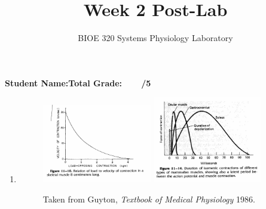 \documentclass{article}
\title{Week 2 Post-Lab}
\author{BIOE 320 Systems Physiology Laboratory}
\date{}
\begin{document}
\maketitle
\large

\textbf{Student Name:}\hfill 	\textbf{Total Grade:\ \ \ \ /5}\vspace{0.5cm}

\begin{enumerate}
	\item
		\begin{figure}[h]
	\includegraphics[width=0.45\textwidth]{../images/EMG_1_12a.jpg}
	\includegraphics[width=0.45\textwidth]{../images/EMG_1_12b.jpg}
		\centering
		\caption{Taken from Guyton, \textit{Textbook of Medical Physiology} 1986.}
		\label{muscles}
\end{figure}
	

\end{enumerate}
\end{document}
